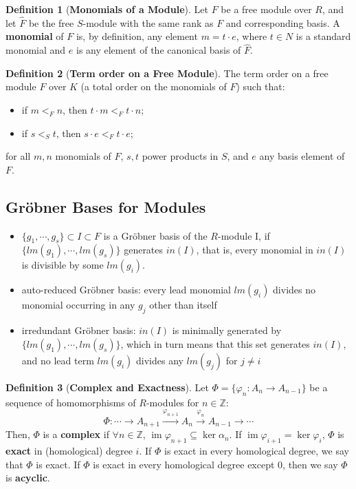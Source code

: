 \documentclass{article}
\newcommand{\im}{\ensuremath{\operatorname{im}}}
\renewcommand{\to}{\ensuremath{\rightarrow}}
\theoremstyle{definition}
\newtheorem{definition}{Definition}[section]
\theoremstyle{remark}
\theoremstyle{example}
\begin{document}
\begin{definition}[\textbf{Monomials of a Module}]
    Let $F$ be a free module over $R$, and let $\hat{F}$ be the free $S$-module with the same rank as $F$ and corresponding basis. A \textbf{monomial} of $F$ is, by definition, any element $m = t \cdot e$, where $t \in N$ is a standard monomial and $e$ is any element of the canonical basis of $\hat{F}$.
\end{definition}

\begin{definition}[\textbf{Term order on a Free Module}]
    The term order on a free module $F$ over $K$ (a total order on the monomials of $F$) such that:
    \begin{itemize}
        \item if $m <_F n$, then $t\cdot m <_F t \cdot n$;
        \item if $s <_S t$, then $s\cdot e <_F t \cdot e$;
    \end{itemize}
    for all $m, n$ monomials of $F$, $s,t$ power products in $S$, and $e$ any basis element of $F$.
\end{definition}

\subsection{Gröbner Bases for Modules}  
\begin{itemize}
    \item $\{g_1, \cdots, g_s\} \subset I\subset F$ is a Gröbner basis of the $R$-module I, if $\{lm(g_1), \cdots, lm(g_s)\}$ generates $in(I)$, that is, every monomial in $in(I)$ is divisible by some $lm(g_i)$.
    \item auto-reduced Gröbner basis: every lead monomial $lm(g_i)$ divides no monomial occurring in any $g_j$ other than itself
    \item irredundant Gröbner basis: $in(I)$ is minimally generated by $\{lm(g_1), \cdots, lm(g_s)\}$, which in turn means that this set generates $in(I)$, and no lead term $lm(g_i)$ divides any $lm(g_j)$ for $j \neq i$
\end{itemize}

\begin{definition}[\textbf{Complex and Exactness}]
    Let $\Phi = \{\varphi_n : A_n \to A_{n-1}\}$ be a sequence of homomorphisms of $R$-modules for $n \in \mathbb{Z}$: 
    \begin{equation}
        \Phi : \cdots \to A_{n+1} \xrightarrow{\varphi_{n+1}} A_n \xrightarrow{\varphi_n} A_{n-1} \to \cdots 
    \end{equation}
    Then, $\Phi$ is a \textbf{complex} if $\forall n \in \mathbb{Z}$, $\im \varphi_{n+1} \subseteq \ker \alpha_n$.  If $\im \varphi_{i+1} = \ker \varphi_i$, $\Phi$ is \textbf{exact} in (homological) degree $i$.  If $\Phi$ is exact
    in every homological degree, we say that $\Phi$ is exact.  If $\Phi$ is exact in every homological degree except 0, then we say $\Phi$ is \textbf{acyclic}.
\end{definition}
\end{document}
